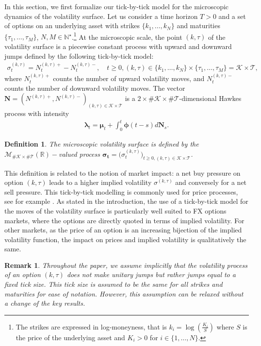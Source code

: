 \documentclass[12pt]{article}
\newtheorem{definition}[theorem2]{Definition}
\newtheorem{remark}[theorem2]{Remark}
\begin{document}
In this section, we first formalize our tick-by-tick model for the microscopic dynamics of the volatility surface. Let us consider a time horizon $T>0$ and a set of options on an underlying asset with strikes $\{k_1, \dots, k_N\}$ and maturities $\{\tau_1,\dots,\tau_M\}$, $N,M\in \mathbb{N}^\star$.\footnote{The strikes are expressed in log-moneyness, that is $k_i=\log(\frac{K_i}{S})$ where $S$ is the price of the underlying asset and $K_i>0$ for $i\in \{1,\dots,N\}$.} At the microscopic scale, the point $(k,\tau)$ of the volatility surface is a piecewise constant process with upward and downward jumps defined by the following tick-by-tick model: 
\begin{align*}%
    \sigma_t^{(k,\tau)} = N_t^{(k,\tau)+} - N_t^{(k,\tau)-}, \quad t\geq 0, (k,\tau)\in \{k_1,\dots,k_N\}\times \{\tau_1,\dots,\tau_M\} = \mathcal{K}\times\mathcal{T}, 
\end{align*}
where $N_t^{(k,\tau)+}$ counts the number of upward volatility moves,
and $N_t^{(k,\tau)-}$ counts the number of downward volatility moves. The vector $\mathbf{N} = (N^{(k,\tau)+}, N^{(k,\tau)-})_{(k,\tau)\in \mathcal{K}\times\mathcal{T}}$ is a $2\times\#\mathcal{K}\times\#\mathcal{T}$-dimensional Hawkes process with intensity 
\begin{align*}
    \boldsymbol{\lambda}_t = \boldsymbol{\mu}_t + \int_0^t \boldsymbol{\phi}(t-s)d\mathbf{N}_{s}.
\end{align*}
\begin{definition}
The microscopic volatility surface is defined by the $\mathcal{M}_{\#\mathcal{K}\times\#\mathcal{T}}(\mathbb{R})-$valued process $\boldsymbol{\sigma_t} = \big(\sigma_t^{(k,\tau)}\big)_{t\geq 0,(k,\tau)\in \mathcal{K}\times\mathcal{T}}$.
\end{definition}
This definition is related to the notion of market impact: a net buy pressure on option $(k,\tau)$ leads to a higher implied volatility $\sigma^{(k,\tau)}$ and conversely for a net sell pressure. This tick-by-tick modelling is commonly used for price processes, see for example \cite{el2018microstructural, tomas2019microscopic}. As stated in the introduction, the use of a tick-by-tick model for the moves of the volatility surface is particularly well suited to FX options markets, where the options are directly quoted in terms of implied volatility. For other markets, as the price of an option is an increasing bijection of the implied volatility function, the impact on prices and implied volatility is qualitatively the same. 
\begin{remark}
Throughout the paper, we assume implicitly that the volatility process of an option $(k,\tau)$ does not make unitary jumps but rather jumps equal to a fixed tick size. This tick size is assumed to be the same for all strikes and maturities for ease of notation. However, this assumption can be relaxed without a change of the key results. 
\end{remark}
\end{document}
